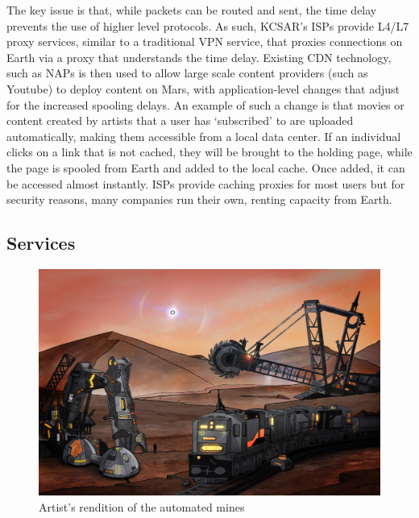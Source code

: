 \documentclass[fleqn,10pt]{Stylesheet} %
\begin{document}
The key issue is that, while packets can be routed and sent, the time delay prevents the use of higher level protocols. As such, KCSAR’s ISPs provide L4/L7 proxy services, similar to a traditional VPN service, that proxies connections on Earth via a proxy that understands the time delay. Existing CDN technology, such as NAPs is then used to allow large scale content providers (such as Youtube) to deploy content on Mars, with application-level changes that adjust for the increased spooling delays. An example of such a change is that movies or content created by artists that a user has ‘subscribed’ to are uploaded automatically, making them accessible from a local data center. If an individual clicks on a link that is not cached, they will be brought to the holding page, while the page is spooled from Earth and added to the local cache. Once added, it can be accessed almost instantly. ISPs provide caching proxies for most users but for security reasons, many companies run their own, renting capacity from Earth.


\subsection{Services}


\begin{figure}
    \centering
    \includegraphics[width=\linewidth]{art/mining.jpg}
    \caption{Artist's rendition of the automated mines}
    \label{fig:mines}
\end{figure}
\end{document}
